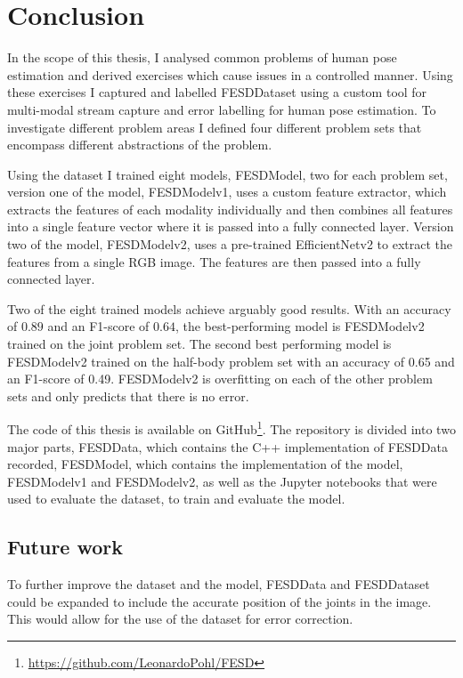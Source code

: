 \chapter{Conclusion}
\label{sec:conclusion}

In the scope of this thesis, I analysed common problems of human pose estimation and derived exercises which cause issues in a controlled manner. Using these exercises I captured and labelled FESDDataset using a custom tool for multi-modal stream capture and error labelling for human pose estimation. To investigate different problem areas I defined four different problem sets that encompass different abstractions of the problem. 

Using the dataset I trained eight models, FESDModel, two for each problem set, version one of the model, FESDModelv1, uses a custom feature extractor, which extracts the features of each modality individually and then combines all features into a single feature vector where it is passed into a fully connected layer. Version two of the model, FESDModelv2, uses a pre-trained EfficientNetv2 to extract the features from a single RGB image. The features are then passed into a fully connected layer.

Two of the eight trained models achieve arguably good results. With an accuracy of $0.89$ and an F1-score of $0.64$, the best-performing model is FESDModelv2 trained on the joint problem set. The second best performing model is FESDModelv2 trained on the half-body problem set with an accuracy of 0.65 and an F1-score of 0.49. FESDModelv2 is overfitting on each of the other problem sets and only predicts that there is no error. %

The code of this thesis is available on GitHub\footnote{\url{https://github.com/LeonardoPohl/FESD}}. The repository is divided into two major parts, FESDData, which contains the C++ implementation of FESDData recorded, FESDModel, which contains the implementation of the model, FESDModelv1 and FESDModelv2, as well as the Jupyter notebooks that were used to evaluate the dataset, to train and evaluate the model.

\section{Future work}
\label{sec:future_work}

To further improve the dataset and the model, FESDData and FESDDataset could be expanded to include the accurate position of the joints in the image. This would allow for the use of the dataset for error correction.

